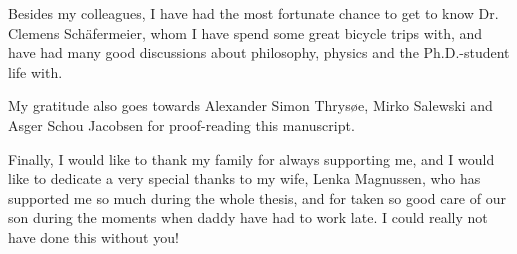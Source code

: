 Besides my colleagues, I have had the most fortunate chance to get to know Dr. Clemens Sch{\"a}fermeier, whom I have spend some great bicycle trips with, and have had many good discussions about philosophy, physics and the Ph.D.-student life with.

My gratitude also goes towards Alexander Simon Thrys{\o}e, Mirko Salewski and Asger Schou Jacobsen for proof-reading this manuscript.

Finally, I would like to thank my family for always supporting me, and I would like to dedicate a very special thanks to my wife, Lenka Magnussen, who has supported me so much during the whole thesis, and for taken so good care of our son during the moments when daddy have had to work late.
I could really not have done this without you!
